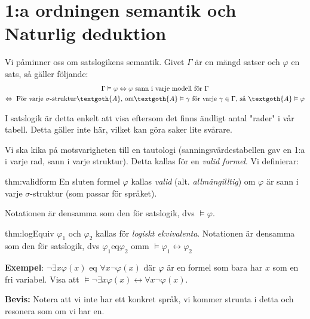 \section{1:a ordningen semantik och Naturlig deduktion}
\par\bigskip
\noindent Vi påminner oss om satslogikens semantik. Givet $\Gamma$ är en mängd satser och $\varphi$ en sats, så gäller följande:
\begin{equation*}
  \begin{gathered}
    \Gamma\vDash\varphi \Lrarr \varphi\text{ sann i varje modell för } \Gamma\\
    \Lrarr\text{ För varje } \sigma\text{-struktur}\textgoth{A}\text{, om}\textgoth{A}\vDash\gamma\text{ för varje }\gamma\in\Gamma\text{, så }\textgoth{A}\vDash\varphi
  \end{gathered}
\end{equation*}
\par\bigskip
\noindent I satslogik är detta enkelt att visa eftersom det finns ändligt antal "rader" i vår tabell. Detta gäller inte här, vilket kan göra saker lite svårare.
\par\bigskip
\noindent Vi ska kika på motsvarigheten till en tautologi (sanningsvärdestabellen gav en 1:a i varje rad, sann i varje struktur). Detta kallas för en \textit{valid formel}. Vi definierar:
\par\bigskip
\begin{theo}{thm:validform}
  En sluten formel $\varphi$ kallas \textit{valid} (alt. \textit{allmängilltig}) om $\varphi$ är sann i varje $\sigma$-struktur (som passar för språket).
  \par\bigskip
  \noindent Notationen är densamma som den för satslogik, dvs $\vDash\varphi$.  
\end{theo}
\par\bigskip
\begin{theo}{thm:logEquiv}
  $\varphi_1$ och $\varphi_2$ kallas för \textit{logiskt ekvivalenta}. Notationen är densamma som den för satslogik, dvs $\varphi_1$eq$\varphi_2$ omm $\vDash\varphi_1\leftrightarrow\varphi_2$
\end{theo}
\par\bigskip
\noindent\textbf{Exempel}: $\neg\exists x \varphi(x)\text{ eq }\forall x\neg\varphi(x)$ där $\varphi$ är en formel som bara har $x$ som en fri variabel. Visa att $\vDash\neg\exists x\varphi(x)\leftrightarrow\forall x\neg\varphi(x)$. 
\par\bigskip
\noindent\textbf{Bevis:} Notera att vi inte har ett konkret språk, vi kommer strunta i detta och resonera som om vi har en.
